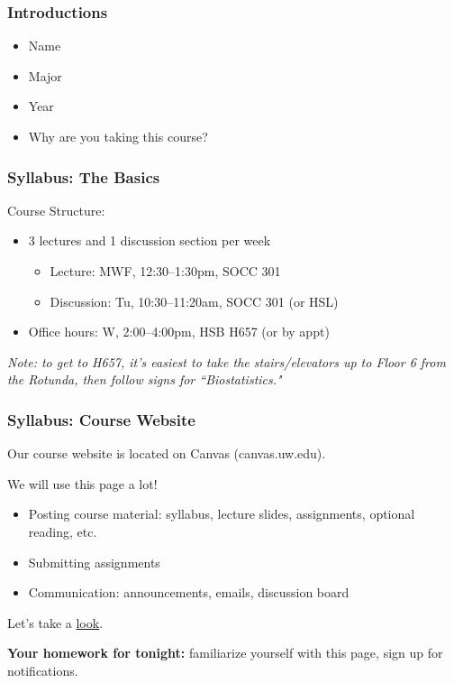 \documentclass[12pt, 
hyperref={colorlinks=true, linkcolor=blue, urlcolor=cyan}]{beamer}
\begin{document}
\begin{frame}
\frametitle{Introductions}
\begin{itemize}
\item Name
\item Major
\item Year
\item Why are you taking this course?
\end{itemize}
\end{frame}

\begin{frame}
\frametitle{Syllabus: The Basics}

Course Structure:
\begin{itemize}
\item 3 lectures and 1 discussion section per week
	\begin{itemize}
	\item Lecture: MWF, 12:30--1:30pm, SOCC 301
	\item Discussion: Tu, 10:30--11:20am, SOCC 301 (or HSL)
	\end{itemize}
\item Office hours: W, 2:00--4:00pm, HSB H657 (or by appt)
\end{itemize}

\small{\textit{Note: to get to H657, it's easiest to take the stairs/elevators up to Floor 6 from the Rotunda, then follow signs for ``Biostatistics."}}

\end{frame}

\begin{frame}
\frametitle{Syllabus: Course Website}

Our course website is located on Canvas (canvas.uw.edu). 

\color{blue} We will use this page a lot! \color{black} %
\begin{itemize}
\item Posting course material: syllabus, lecture slides, assignments, optional reading, etc. %
\item Submitting assignments
\item Communication: announcements, emails, discussion board
\end{itemize}

Let's take a \href{https://canvas.uw.edu/courses/1203588}{look}. %

\textbf{Your homework for tonight:} familiarize yourself with this page, sign up for notifications.

\end{frame}
\end{document}
